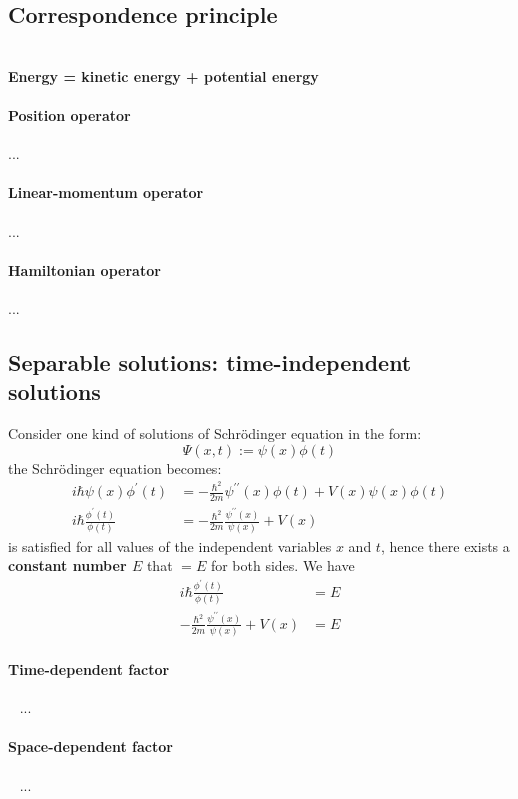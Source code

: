 \subsection{Correspondence principle}
\\
\textbf{Energy = kinetic energy + potential energy}

\paragraph{Position operator}
...

\paragraph{Linear-momentum operator}
...

\paragraph{Hamiltonian operator}
...

\subsection{Separable solutions: time-independent solutions}
Consider one kind of solutions of Schrödinger equation in the form:
$$
    \Psi(x, t):= \psi(x) \phi(t)
$$
the Schrödinger equation becomes:
\begin{align}
    i \hbar \psi(x) \phi^{\prime}(t)         & =-\frac{\hbar^{2}}{2 m} \psi^{\prime \prime}(x) \phi(t)+V(x) \psi(x) \phi(t)    \\
    i \hbar \frac{\phi^{\prime}(t)}{\phi(t)} & =-\frac{\hbar^{2}}{2 m} \frac{\psi^{\prime \prime}(x)}{\psi(x)}+V(x)\label{eq7}
\end{align}
 is satisfied for all values of the independent variables $x$ and $t$, hence there exists a \textbf{constant number $E$} that  $=E$ for both sides. We have
\begin{align}
    i \hbar \frac{\phi^{\prime}(t)}{\phi(t)}                            & =E \label{eq8} \\
    -\frac{\hbar^{2}}{2 m} \frac{\psi^{\prime \prime}(x)}{\psi(x)}+V(x) & =E\label{eq9}
\end{align}
\paragraph{Time-dependent factor }~{}
...
\paragraph{Space-dependent factor }~{}
...

